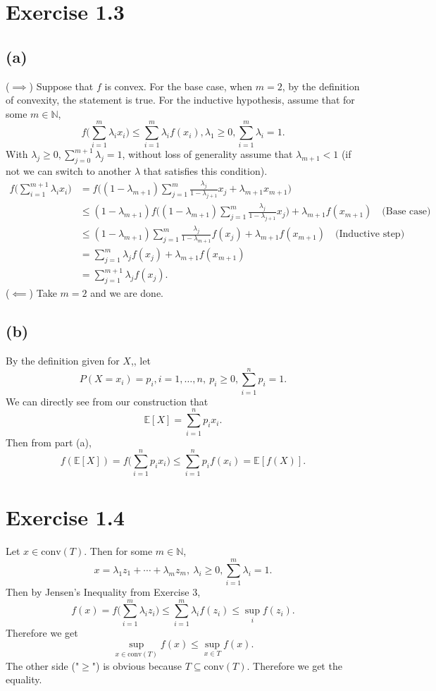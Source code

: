 \newpage
\section*{Exercise 1.3}
\subsection*{(a)}
($\implies$) Suppose that $f$ is convex. For the base case, when $m = 2$, by the definition of convexity, 
the statement is true. For the inductive hypothesis, assume that for some $m \in \mathbb{N}$, 
\[ f \biggl( \sum_{i = 1}^{m} \lambda_i x_i \biggr) \leq \sum_{i = 1}^{m} \lambda_i f(x_i), \lambda_1 \geq 0, 
\sum_{i = 1}^{m} \lambda_i = 1. \]
With $\lambda_j \geq 0, \sum_{j = 0}^{m + 1} \lambda_j = 1$, without loss of generality assume that 
$\lambda_{m + 1} < 1$ (if not we can switch to another $\lambda$ that satisfies this condition). 
\begin{align*}
	f \biggl( \sum_{i = 1}^{m + 1} \lambda_i x_i \biggr) 
	&= f \biggl( (1 - \lambda_{m + 1}) \sum_{j = 1}^{m} \frac{\lambda_j}{1 - \lambda_{j + 1}} x_j + \lambda_{m + 1} x_{m + 1} \biggr) \\
	&\leq (1 - \lambda_{m + 1})  f \biggl( (1 - \lambda_{m + 1}) \sum_{j = 1}^{m} \frac{\lambda_j}{1 - \lambda_{j + 1}} x_j \biggr) 
	+ \lambda_{m + 1} f(x_{m + 1}) \quad \text{(Base case)} \\
	&\leq (1 - \lambda_{m + 1}) \sum_{j = 1}^{m} \frac{\lambda_j}{1 - \lambda_{m + 1}}f(x_j) + \lambda_{m + 1}f(x_{m + 1}) \quad 
	\text{(Inductive step)} \\
	&= \sum_{j = 1}^{m} \lambda_j f(x_j) + \lambda_{m + 1} f(x_{m + 1}) \\
	&= \sum_{j = 1}^{m + 1} \lambda_j f(x_j).
\end{align*}
($\impliedby$) Take $m = 2$ and we are done.

\subsection*{(b)}
By the definition given for $X$,, let 
\[ P(X = x_i) = p_i, i = 1, \dots, n, \ p_i \geq 0, \sum_{i = 1}^{n} p_i = 1. \]
We can directly see from our construction that 
\[ \mathbb{E}[X] = \sum_{i = 1}^{n} p_i x_i. \]
Then from part (a), 
\[ f(\mathbb{E}[X]) = f \biggl( \sum_{i = 1}^{n} p_i x_i \biggr) 
\leq \sum_{i = 1}^{n} p_i f(x_i) = \mathbb{E}[f(X)]. \]


\newpage
\section*{Exercise 1.4}
Let $x \in \text{conv}(T)$. Then for some $m \in \mathbb{N}$, 
\[ x = \lambda_1 z_1 + \cdots + \lambda_m z_m, \ \lambda_i \geq 0, \sum_{i = 1}^{m} \lambda_i = 1. \]
Then by Jensen's Inequality from Exercise 3, 
\[ f(x) = f \biggl( \sum_{i = 1}^{m} \lambda_i z_i \biggr) \leq \sum_{i = 1}^{m} \lambda_i f(z_i) \leq \sup_{i} f(z_i). \]
Therefore we get 
\[ \sup_{x \in \text{conv}(T)} f(x) \leq \sup_{x \in T} f(x). \]
The other side ("$\geq$") is obvious because $T \subseteq \text{conv}(T)$. Therefore we get the equality.


